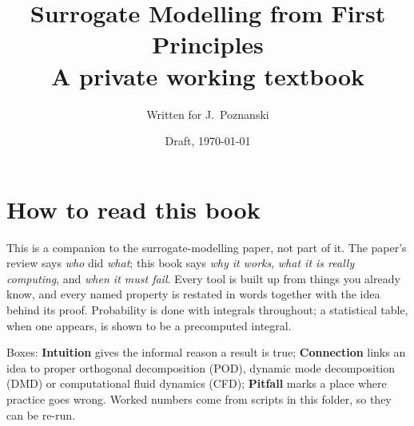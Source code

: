 \documentclass[11pt,oneside]{book}
\title{Surrogate Modelling from First Principles\\[6pt]\large A private working textbook}
\author{Written for J.~Poznanski}
\date{Draft, \today}
\theoremstyle{plainbox}
\theoremstyle{aside}
\begin{document}
\frontmatter
\maketitle
\chapter*{How to read this book}
This is a companion to the surrogate-modelling paper, not part of it. The paper's review says \emph{who} did
\emph{what}; this book says \emph{why it works}, \emph{what it is really computing}, and \emph{when it must fail}.
Every tool is built up from things you already know, and every named property is restated in words together with
the idea behind its proof. Probability is done with integrals throughout; a statistical table, when one appears, is
shown to be a precomputed integral.

Boxes: \textbf{Intuition} gives the informal reason a result is true; \textbf{Connection} links an idea to proper
orthogonal decomposition (POD), dynamic mode decomposition (DMD) or computational fluid dynamics (CFD);
\textbf{Pitfall} marks a place where practice goes wrong. Worked numbers come from scripts in this folder, so they
can be re-run.

\tableofcontents
\mainmatter



\end{document}
